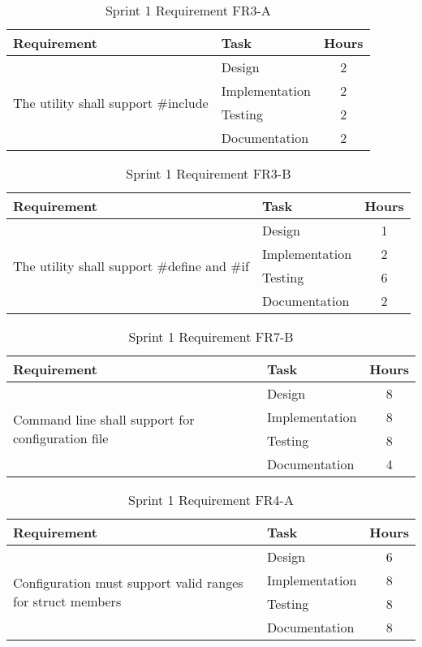 \begin{table}[ht] \small \center
\caption{Sprint 1 Requirement FR3-A}
\begin{tabular}{l l c}
	\toprule
	Requirement & Task & Hours \\
	\midrule
	\multirow{4}{5cm}{The utility shall support \#include} & Design & 2 \\
	& Implementation & 2 \\
	& Testing & 2 \\
	& Documentation & 2 \\
	\bottomrule
\end{tabular}
\end{table}

\begin{table}[ht] \small \center
\caption{Sprint 1 Requirement FR3-B}
\begin{tabular}{l l c}
	\toprule
	Requirement & Task & Hours \\
	\midrule
	\multirow{4}{5cm}{The utility shall support \#define and \#if} & Design & 1 \\
	& Implementation & 2 \\
	& Testing & 6 \\
	& Documentation & 2 \\
	\bottomrule
\end{tabular}
\end{table}

\begin{table}[ht] \small \center
\caption{Sprint 1 Requirement FR7-B}
\begin{tabular}{l l c}
	\toprule
	Requirement & Task & Hours \\
	\midrule
	\multirow{4}{5cm}{Command line shall support for configuration file} & Design & 8 \\
	& Implementation & 8 \\
	& Testing & 8 \\
	& Documentation & 4 \\
	\bottomrule
\end{tabular}
\end{table}

\begin{table}[ht] \small \center
\caption{Sprint 1 Requirement FR4-A}
\begin{tabular}{l l c}
	\toprule
	Requirement & Task & Hours \\
	\midrule
	\multirow{4}{5cm}{Configuration must support valid ranges for struct members} & Design & 6 \\
	& Implementation & 8 \\
	& Testing & 8 \\
	& Documentation & 8 \\
	\bottomrule
\end{tabular}
\end{table}

